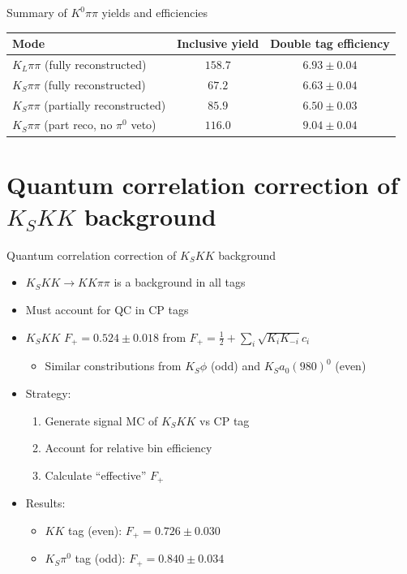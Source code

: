 \documentclass{beamer}
\begin{document}
\begin{frame}{Summary of $K^0\pi\pi$ yields and efficiencies}
  \centering
  \def\arraystretch{1.2}%
  \begin{tabular}{l|c|c}
    Mode                                     & Inclusive yield & Double tag efficiency \\
    \hline
    $K_L\pi\pi$ (fully reconstructed)        & $158.7$         & $6.93 \pm 0.04$ \\
    $K_S\pi\pi$ (fully reconstructed)        & $67.2$          & $6.63 \pm 0.04$ \\
    $K_S\pi\pi$ (partially reconstructed)    & $85.9$          & $6.50 \pm 0.03$ \\
    $K_S\pi\pi$ (part reco, no $\pi^0$ veto) & $116.0$         & $9.04 \pm 0.04$ \\
    \hline
  \end{tabular}
\end{frame}

\section{Quantum correlation correction of \texorpdfstring{$K_SKK$}{KSKK} background}

\begin{frame}{Quantum correlation correction of $K_SKK$ background}
  \begin{itemize}
    \setlength\itemsep{1.0em}
    \item{$K_SKK\to KK\pi\pi$ is a background in all tags}
    \item{Must account for QC in CP tags}
    \item{$K_SKK$ $F_+ = 0.524\pm0.018$ from $F_+ = \frac{1}{2} + \sum_i\sqrt{K_iK_{-i}}c_i$}
    \begin{itemize}
      \item{Similar constributions from $K_S\phi$ (odd) and $K_Sa_0(980)^0$ (even)}
    \end{itemize}
    \item{Strategy:}
    \begin{enumerate}
      \item{Generate signal MC of $K_SKK$ vs CP tag}
      \item{Account for relative bin efficiency}
      \item{Calculate ``effective'' $F_+$}
    \end{enumerate}
    \item{Results:}
    \begin{itemize}
      \item{$KK$ tag (even): $F_+ = 0.726\pm0.030$}
      \item{$K_S\pi^0$ tag (odd): $F_+ = 0.840\pm0.034$}
    \end{itemize}
  \end{itemize}
\end{frame}
\end{document}
